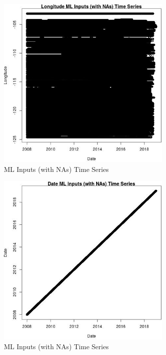 \begin{figure} 
\centering  
\includegraphics[width=0.77\textwidth]{Code_Outputs/Report_ML_input_PM25_Step4_part_e_de_duplicated_aves_compiled_2019-05-21wNAs_LongitudevDate.jpg} 
\caption{\label{fig:Report_ML_input_PM25_Step4_part_e_de_duplicated_aves_compiled_2019-05-21wNAsLongitudevDate}ML Inputs (with NAs) Time Series} 
\end{figure} 
 

\begin{figure} 
\centering  
\includegraphics[width=0.77\textwidth]{Code_Outputs/Report_ML_input_PM25_Step4_part_e_de_duplicated_aves_compiled_2019-05-21wNAs_DatevDate.jpg} 
\caption{\label{fig:Report_ML_input_PM25_Step4_part_e_de_duplicated_aves_compiled_2019-05-21wNAsDatevDate}ML Inputs (with NAs) Time Series} 
\end{figure} 
 

